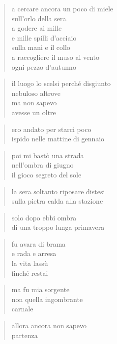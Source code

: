 \begin{verse}
    a cercare ancora un poco di miele\\
    sull'orlo della sera\\
    a godere ai mille\\
    e mille spilli d'acciaio\\
    sulla mani e il collo\\
    a raccogliere il muso al vento\\
    ogni pezzo d'autunno
\end{verse}

\clearpage


\begin{verse}
    il luogo lo scelsi perché disgiunto\\
    nebuloso altrove\\
    ma non sapevo\\
    avesse un oltre
\end{verse}

\begin{verse}
    ero andato per starci poco\\
    ispido nelle mattine di gennaio
\end{verse}

\begin{verse}
    poi mi bastò una strada\\
    nell'ombra di giugno\\
    il gioco segreto del sole
\end{verse}

\begin{verse}
    la sera soltanto riposare distesi\\
    sulla pietra calda alla stazione
\end{verse}

\begin{verse}
    solo dopo ebbi ombra\\
    di una troppo lunga primavera
\end{verse}

\clearpage


\begin{verse}
    fu avara di brama\\
    e rada e arresa\\
    la vita lassù\\
    finché restai
\end{verse}

\begin{verse}
    ma fu mia sorgente\\
    non quella ingombrante\\
    carnale
\end{verse}

\begin{verse}
    allora ancora non sapevo\\
    partenza
\end{verse}
